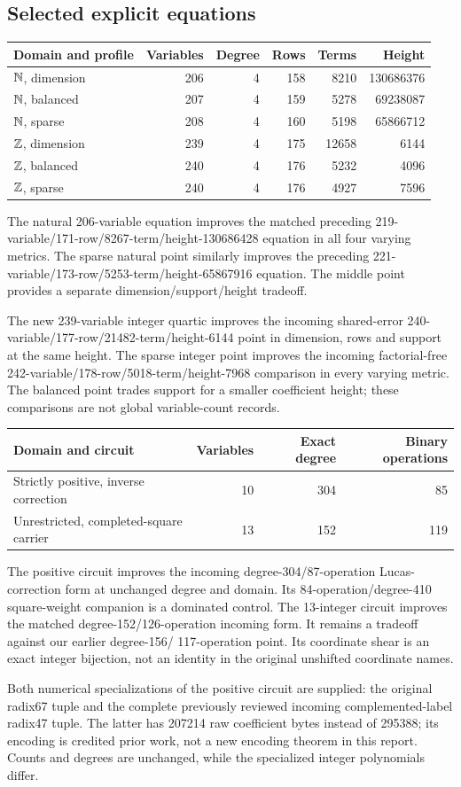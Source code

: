 \subsection{Selected explicit equations}
\begin{center}\small
\begin{tabular}{lrrrrr}\toprule
Domain and profile & Variables & Degree & Rows & Terms & Height\\\midrule
$\mathbb N$, dimension &206&4&158&8210&130686376\\
$\mathbb N$, balanced &207&4&159&5278&69238087\\
$\mathbb N$, sparse &208&4&160&5198&65866712\\\midrule
$\mathbb Z$, dimension &239&4&175&12658&6144\\
$\mathbb Z$, balanced &240&4&176&5232&4096\\
$\mathbb Z$, sparse &240&4&176&4927&7596\\\bottomrule
\end{tabular}
\end{center}
The natural 206-variable equation improves the matched preceding
219-variable/171-row/8267-term/height-130686428 equation in all four
varying metrics. The sparse natural point similarly improves the
preceding 221-variable/173-row/5253-term/height-65867916 equation.
The middle point provides a separate dimension/support/height tradeoff.

The new 239-variable integer quartic improves the incoming shared-error
240-variable/177-row/21482-term/height-6144 point in dimension, rows and
support at the same height. The sparse integer point improves the
incoming factorial-free 242-variable/178-row/5018-term/height-7968
comparison in every varying metric. The balanced point trades support
for a smaller coefficient height; these comparisons are not global
variable-count records.

\begin{center}
\begin{tabular}{lrrr}\toprule
Domain and circuit & Variables & Exact degree & Binary operations\\\midrule
Strictly positive, inverse correction &10&304&85\\
Unrestricted, completed-square carrier &13&152&119\\\bottomrule
\end{tabular}
\end{center}
The positive circuit improves the incoming degree-304/87-operation
Lucas-correction form at unchanged degree and domain. Its
84-operation/degree-410 square-weight companion is a dominated control.
The 13-integer circuit improves the matched degree-152/126-operation
incoming form. It remains a tradeoff against our earlier degree-156/
117-operation point. Its coordinate shear is an exact integer bijection,
not an identity in the original unshifted coordinate names.

Both numerical specializations of the positive circuit are supplied:
the original radix67 tuple and the complete previously reviewed
incoming complemented-label radix47 tuple. The latter has 207214 raw
coefficient bytes instead of 295388; its encoding is credited prior
work, not a new encoding theorem in this report. Counts and degrees
are unchanged, while the specialized integer polynomials differ.
